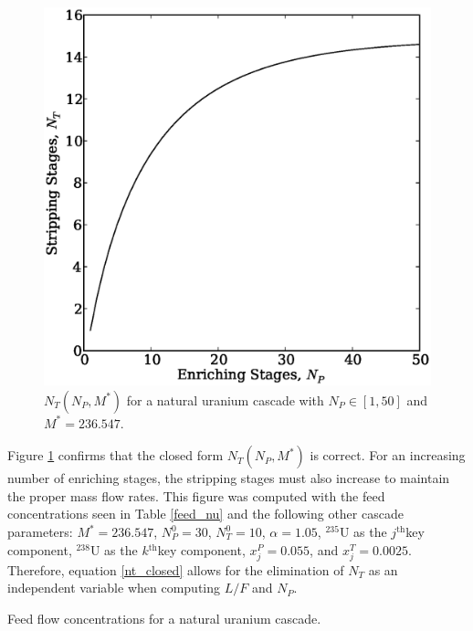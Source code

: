 \documentclass[preprint,12pt]{elsarticle}
\newcommand{\superscript}[1]{\ensuremath{^{\textrm{#1}}}}
\newcommand{\nuc}[2]{\superscript{#2}{#1}}
\newcommand{\jth}[0]{$j$\superscript{th}}
\newcommand{\kth}[0]{$k$\superscript{th}}
\begin{document}
\begin{figure}[htpb]
\begin{center}
\includegraphics[scale=0.5]{nt_closed.eps}
\caption{$N_T(N_P, M^*)$ for a natural uranium cascade with $N_P\in[1,50]$ and 
    $M^*=236.547$.}
\label{nt_closed_fig}
\end{center}
\end{figure}

Figure \ref{nt_closed_fig} confirms that the closed form $N_T(N_P, M^*)$ is correct.
For an increasing number of enriching stages, the stripping stages must also 
increase to maintain the proper mass flow rates.
This figure was computed 
with the feed concentrations seen in Table \ref{feed_nu} and the following other 
cascade parameters: $M^*=236.547$, $N_P^0=30$, $N_T^0=10$, $\alpha=1.05$, 
\nuc{U}{235} as the \jth key component, \nuc{U}{238} as the \kth key component, 
$x_j^P=0.055$, and $x_j^T=0.0025$.
Therefore, equation \ref{nt_closed} allows for the elimination of $N_T$ as an 
independent variable when computing $L/F$ and $N_P$.  

\begin{table}[htbp]
\begin{center}
\caption{Feed flow concentrations for a natural uranium cascade.}

\end{center}
\label{feed_nu}
\end{table}
\end{document}
